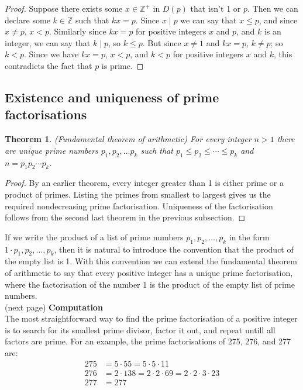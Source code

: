 \documentclass{report}
\newtheorem*{theorem}{Theorem}
\theoremstyle{definition}
\begin{document}
\begin{proof}
Suppose there exists some $x\in\mathbb Z^+$ in $D(p)$ that isn't 1 or $p$. Then we can declare some $k\in\mathbb Z$ such that $kx=p$. Since $x\mid p$ we can say that $x\leq p$, and since $x\neq p$, $x<p$. 
Similarly since $kx=p$ for positive integers $x$ and $p$, and $k$ is an integer, we can say that $k\mid p$, so $k\leq p$. But since $x\neq1$ and $kx=p$, $k\neq p$; so $k<p$. Since we have $kx=p$,  
$x<p$, and $k<p$ for positive integers $x$ and $k$, this contradicts the fact that $p$ is prime.
\end{proof}

\subsection{Existence and uniqueness of prime factorisations}
\begin{theorem}
(Fundamental theorem of arithmetic) For every integer $n>1$ there are unique prime numbers $p_1,p_2,\ldots p_k$ such that $p_1\leq p_2\leq\cdots\leq p_k$ and $n=p_1p_2\cdots p_k$.
\end{theorem}
\begin{proof}
By an earlier theorem, every integer greater than 1 is either prime or a product of primes. Listing
the primes from smallest to largest gives us the required nondecreasing prime factorisation. Uniqueness of the factorisation follows from the second last theorem in the previous subsection.
\end{proof}
\noindent If we write the product of a list of prime numbers $p_1,p_2,\ldots,p_k$ in the form 
$1\cdot p_1,p_2,\ldots,p_k$, then it is natural to introduce the convention
that the product of the empty list is 1. With this convention we can extend the fundamental theorem of arithmetic to say that every positive integer has a unique prime factorisation, where the
factorisation of the number 1 is the product of the empty list of prime numbers.\\
(next page)\newpage
\noindent\textbf{Computation}\\
The most straightforward way to find the prime factorisation of a positive integer is to search for its smallest prime divisor, factor it out, and repeat untill all factors are prime. For an example, the prime factorisations of 275, 276, and 277 are:
\begin{align*}
275&=5\cdot55=5\cdot5\cdot11\\
276&=2\cdot138=2\cdot2\cdot69=2\cdot2\cdot3\cdot23\\
277&=277
\end{align*}
\end{document}
